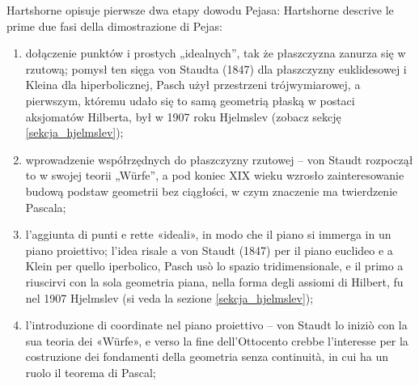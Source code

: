 Hartshorne \cite[s. 426]{hartshorne_2000} opisuje pierwsze dwa etapy dowodu Pejasa: %
Hartshorne \cite[p. 426]{hartshorne_2000} descrive le prime due fasi della dimostrazione di Pejas: %
\begin{enumerate}
\item dołączenie punktów i prostych „idealnych'', tak że płaszczyzna zanurza się w rzutową; pomysł ten sięga von Staudta (1847) dla płaszczyzny euklidesowej i Kleina dla hiperbolicznej, Pasch użył przestrzeni trójwymiarowej, a pierwszym, któremu udało się to samą geometrią płaską w postaci aksjomatów Hilberta, był w 1907 roku Hjelmslev (zobacz sekcję \ref{sekcja_hjelmslev}); %
\item wprowadzenie współrzędnych do płaszczyzny rzutowej -- von Staudt rozpoczął to w swojej teorii „Würfe'', a pod koniec XIX wieku wzrosło zainteresowanie budową podstaw geometrii bez ciągłości, w czym znaczenie ma twierdzenie Pascala; %
\item l'aggiunta di punti e rette «ideali», in modo che il piano si immerga in un piano proiettivo; l'idea risale a von Staudt (1847) per il piano euclideo e a Klein per quello iperbolico, Pasch usò lo spazio tridimensionale, e il primo a riuscirvi con la sola geometria piana, nella forma degli assiomi di Hilbert, fu nel 1907 Hjelmslev (si veda la sezione \ref{sekcja_hjelmslev}); %
\item l'introduzione di coordinate nel piano proiettivo -- von Staudt lo iniziò con la sua teoria dei «Würfe», e verso la fine dell'Ottocento crebbe l'interesse per la costruzione dei fondamenti della geometria senza continuità, in cui ha un ruolo il teorema di Pascal; %
\end{enumerate}
%
%


